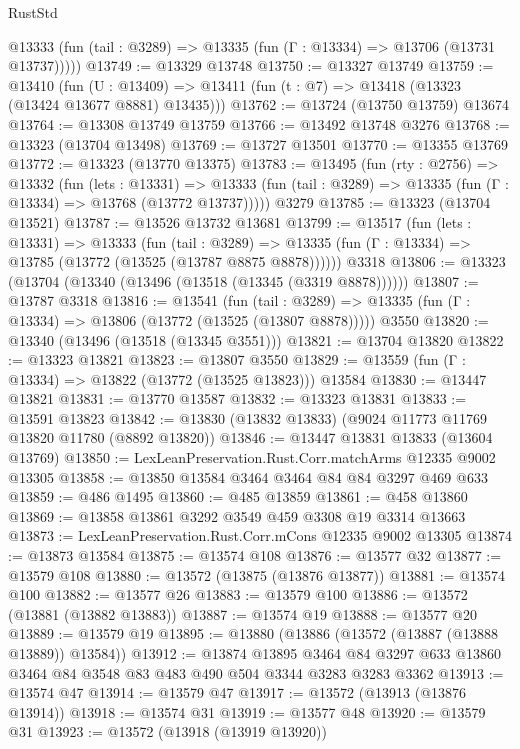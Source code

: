 \begin{lexlean}{RustStd}
\begin{coremodule}
      @13333 (fun (tail : @3289) => @13335 (fun (Γ : @13334) => @13706 (@13731 @13737)))))
@13749 := @13329 @13748
@13750 := @13327 @13749
@13759 := @13410
    (fun (U : @13409) => @13411 (fun (t : @7) => @13418 (@13323 (@13424 @13677 @8881) @13435)))
@13762 := @13724 (@13750 @13759) @13674
@13764 := @13308 @13749 @13759
@13766 := @13492 @13748 @3276
@13768 := @13323 (@13704 @13498)
@13769 := @13727 @13501
@13770 := @13355 @13769
@13772 := @13323 (@13770 @13375)
@13783 := @13495
    (fun (rty : @2756) =>
    @13332
      (fun (lets : @13331) =>
      @13333 (fun (tail : @3289) => @13335 (fun (Γ : @13334) => @13768 (@13772 @13737)))))
    @3279
@13785 := @13323 (@13704 @13521)
@13787 := @13526 @13732 @13681
@13799 := @13517
    (fun (lets : @13331) =>
    @13333
      (fun (tail : @3289) =>
      @13335 (fun (Γ : @13334) => @13785 (@13772 (@13525 (@13787 @8875 @8878))))))
    @3318
@13806 := @13323 (@13704 (@13340 (@13496 (@13518 (@13345 (@3319 @8878))))))
@13807 := @13787 @3318
@13816 := @13541
    (fun (tail : @3289) => @13335 (fun (Γ : @13334) => @13806 (@13772 (@13525 (@13807 @8878)))))
    @3550
@13820 := @13340 (@13496 (@13518 (@13345 @3551)))
@13821 := @13704 @13820
@13822 := @13323 @13821
@13823 := @13807 @3550
@13829 := @13559 (fun (Γ : @13334) => @13822 (@13772 (@13525 @13823))) @13584
@13830 := @13447 @13821
@13831 := @13770 @13587
@13832 := @13323 @13831
@13833 := @13591 @13823
@13842 := @13830 (@13832 @13833) (@9024 @11773 @11769 @13820 @11780 (@8892 @13820))
@13846 := @13447 @13831 @13833 (@13604 @13769)
@13850 := LexLeanPreservation.Rust.Corr.matchArms @12335 @9002 @13305
@13858 := @13850 @13584 @3464 @3464 @84 @84 @3297 @469 @633
@13859 := @486 @1495
@13860 := @485 @13859
@13861 := @458 @13860
@13869 := @13858 @13861 @3292 @3549 @459 @3308 @19 @3314 @13663
@13873 := LexLeanPreservation.Rust.Corr.mCons @12335 @9002 @13305
@13874 := @13873 @13584
@13875 := @13574 @108
@13876 := @13577 @32
@13877 := @13579 @108
@13880 := @13572 (@13875 (@13876 @13877))
@13881 := @13574 @100
@13882 := @13577 @26
@13883 := @13579 @100
@13886 := @13572 (@13881 (@13882 @13883))
@13887 := @13574 @19
@13888 := @13577 @20
@13889 := @13579 @19
@13895 := @13880 (@13886 (@13572 (@13887 (@13888 @13889)) @13584))
@13912 := @13874
    @13895
    @3464
    @84
    @3297
    @633
    @13860
    @3464
    @84
    @3548
    @83
    @483
    @490
    @504
    @3344
    @3283
    @3283
    @3362
@13913 := @13574 @47
@13914 := @13579 @47
@13917 := @13572 (@13913 (@13876 @13914))
@13918 := @13574 @31
@13919 := @13577 @48
@13920 := @13579 @31
@13923 := @13572 (@13918 (@13919 @13920))

\end{coremodule}
\end{lexlean}
